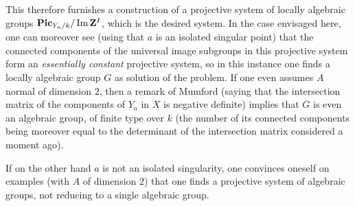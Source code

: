 This therefore furnishes a construction of a projective system of locally algebraic groups $\mathbf{Pic}_{Y_n/k}/\operatorname{Im} \mathbf{Z}^I$, which is the desired system. In the case envisaged here, one can moreover see (using that $a$ is an isolated singular point) that the connected components of the universal image subgroups in this projective system form an \emph{essentially constant} projective system, so in this instance one finds a locally algebraic group $G$ as solution of the problem. If one even assumes $A$ normal of dimension $2$, then a remark of Mumford (saying that the intersection matrix of the components of $Y_{a}$ in $X$ is negative definite) implies that $G$ is even an algebraic group, \ie of finite type over $k$ (the number of its connected components being moreover equal to the determinant of the intersection matrix considered a moment ago).

If on the other hand $a$ is not an isolated singularity, one convinces oneself on examples (with $A$ of dimension $2$) that one finds a projective system of algebraic groups, not reducing to a single algebraic group.

